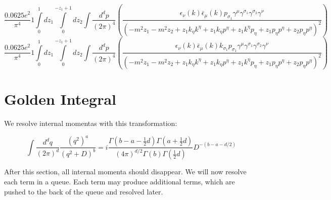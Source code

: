 \begin{dmath}\frac{0.0625 e^{2}}{\pi^{4}}1\int\limits_{ 0 }^{ 1 } d{ z_{ 1 } }\int\limits_{ 0 }^{ - { z_{ 1 } } + 1 } d{ z_{ 2 } }\int\frac{d^d p }{ (2\pi)^4 }\left(\frac{\epsilon_{ \nu }({ k }) \bar{\epsilon}_{ \mu }({ k }) { { p }_{ \sigma_1 } } { \gamma^{ \mu } } { \gamma^{ \sigma_1 } } { \gamma^{ \sigma_2 } } { \gamma^{ \nu } }}{\left(- m^{2} { z_{ 1 } } - m^{2} { z_{ 2 } } + { z_{ 1 } } { { k }_{ \eta } } { { k }^{ \eta } } + { z_{ 1 } } { { k }_{ \eta } } { { p }^{ \eta } } + { z_{ 1 } } { { k }^{ \eta } } { { p }_{ \eta } } + { z_{ 1 } } { { p }_{ \eta } } { { p }^{ \eta } } + { z_{ 2 } } { { p }_{ \eta } } { { p }^{ \eta } }\right)^{2}}\right)\end{dmath}
\begin{dmath}\frac{0.0625 e^{2}}{\pi^{4}}1\int\limits_{ 0 }^{ 1 } d{ z_{ 1 } }\int\limits_{ 0 }^{ - { z_{ 1 } } + 1 } d{ z_{ 2 } }\int\frac{d^d p }{ (2\pi)^4 }\left(\frac{\epsilon_{ \nu }({ k }) \bar{\epsilon}_{ \mu }({ k }) { { k }_{ \sigma_1 } } { { p }_{ \sigma_1 } } { \gamma^{ \mu } } { \gamma^{ \sigma_1 } } { \gamma^{ \sigma_2 } } { \gamma^{ \nu } }}{\left(- m^{2} { z_{ 1 } } - m^{2} { z_{ 2 } } + { z_{ 1 } } { { k }_{ \eta } } { { k }^{ \eta } } + { z_{ 1 } } { { k }_{ \eta } } { { p }^{ \eta } } + { z_{ 1 } } { { k }^{ \eta } } { { p }_{ \eta } } + { z_{ 1 } } { { p }_{ \eta } } { { p }^{ \eta } } + { z_{ 2 } } { { p }_{ \eta } } { { p }^{ \eta } }\right)^{2}}\right)\end{dmath}
\section*{{Golden Integral}}
We resolve internal momentas with this transformation:

    $$\int \frac{d^d q}{(2 \pi)^d} \frac{(q^2)^a}{(q^2 + D)^b} = i \frac{\Gamma (b-a-\frac{1}{2}d) \Gamma (a + \frac{1}{2} d)}{(4 \pi)^{d/2} \Gamma(b) \Gamma(\frac{1}{2}d)} D^{-(b-a-d/2)}$$
    
After this section, all internal momenta should disappear.  We will now resolve each term in a queue.  Each term may produce additional terms, which are pushed to the back of the queue and resolved later.
